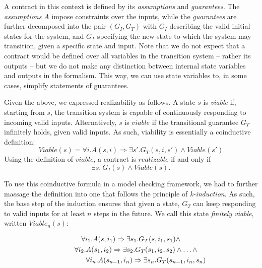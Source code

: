 A contract in this context is defined by its
\textit{assumptions} and \textit{guarantees}. The \textit{assumptions} $A$
impose constraints over the inputs, while the \textit{guarantees} are
further decomposed into the pair $(G_I,G_T)$ with $G_I$ describing the
valid initial states for the system, and $G_T$ specifying the new state to which
the system may transition, given a specific state and input. Note that we do not
expect that a contract would be defined over all variables in the transition system
-- rather its outputs -- but we do not make any distinction between internal state variables
and outputs in the formalism.  This way, we can use state variables to, in some cases, simplify statements of guarantees.

Given the above, we expressed realizability as follows. A state $s$ is
\textit{viable} if, starting from $s$, the transition system is capable of continuously responding to
incoming valid inputs. Alternatively, $s$ is $viable$ if the transitional
guarantee $G_T$ infinitely holds, given valid inputs. As such, viability is
essentially a coinductive definition:
\begin{equation}
\label{eq:viable}
Viable(s) = \forall i. A(s,i) \Rightarrow \exists s'. G_{T}(s,i,s') \wedge
Viable(s')
\end{equation}
Using the definition of $viable$, a
contract is $realizable$ if and only if
\begin{equation}
\label{eq:realizable}
 \exists s.~ G_I(s) \land Viable(s).
\end{equation}

To use this coinductive formula in a model checking framework, we had to further
massage the definition into one that follows the principle of
\textit{k-induction}. As such, the base step of the induction ensures that
given a state, $G_T$ can keep responding to valid inputs for at least $n$ steps
in the future. We call this state \textit{finitely viable}, written
$Viable_{n}(s)$:

\begin{multline}
\label{ml:fv}
		\forall i_1. A(s,i_1) \Rightarrow \exists s_1. G_T(s,i_1,s_1) \wedge \\
			\hspace{+0.5cm} \forall i_2. A(s_1,i_2) \Rightarrow \exists s_2.
			 G_T(s_1,i_2,s_2) \wedge \ldots \wedge \\
			 \hspace{+1.5cm} \forall i_n. A(s_{n-1},i_n) \Rightarrow \exists s_n. G_T(s_{n-1},i_n,s_n)
	\end{multline}

